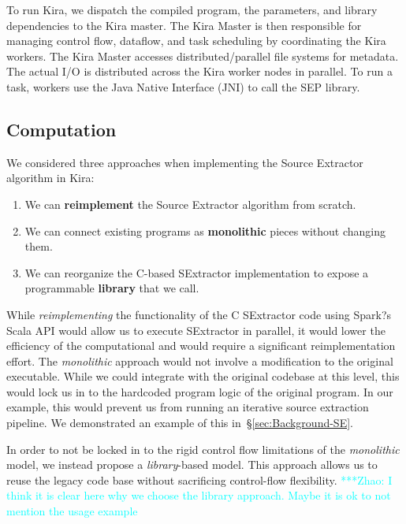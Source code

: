 \documentclass[conference]{IEEEtran}
\newcommand{\zhaonote}[1]{{\textcolor{cyan}    { ***Zhao:      #1 }}}
\newcommand{\zhaonote}[1]{}
\begin{document}
To run Kira, we dispatch the compiled program, the parameters, and library dependencies to the Kira master.
The Kira Master is then responsible for managing control flow, dataflow, and task scheduling 
by coordinating the Kira workers. 
The Kira Master accesses distributed/parallel file systems for metadata.
The actual I/O is distributed across the Kira worker nodes in
parallel. To run a task, workers use the Java Native Interface (JNI) to call the SEP library.

\subsection{Computation}
\label{sec:Design-Computation}
We considered three approaches when implementing the Source Extractor algorithm in Kira:

\begin{enumerate}
\item We can \textbf{reimplement} the Source Extractor algorithm from scratch.
\item We can connect existing programs as \textbf{monolithic} pieces without changing them.
\item We can reorganize the C-based SExtractor implementation to expose a programmable
\textbf{library} that we call.
\end{enumerate}

While \emph{reimplementing} the functionality of the C SExtractor code using Spark?s Scala API 
would allow us to execute SExtractor in parallel, it would lower the efficiency of the computational 
and would require a significant reimplementation effort.
The \emph{monolithic} approach would not involve a modification to the original executable. While we could 
integrate with the original codebase at this level, this would lock us in to the hardcoded program logic 
of the original program. In our example, this would prevent us from running an iterative source extraction 
pipeline.  We demonstrated an example of this in~\S\ref{sec:Background-SE}.

In order to not be locked in to the rigid control flow limitations of the \emph{monolithic} model, 
we instead propose a \emph{library}-based model.
This approach allows us to reuse the legacy code base without sacrificing control-flow flexibility.  
\zhaonote{I think it is clear here why we choose the library approach. Maybe it is ok to not mention the usage example}
\end{document}
